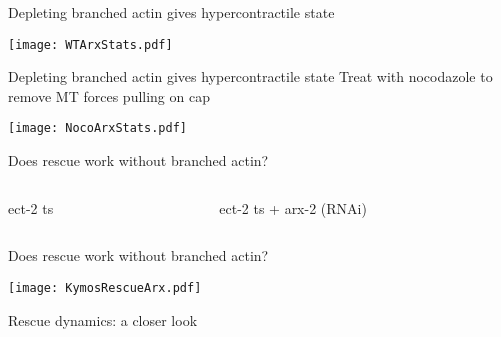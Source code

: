 \documentclass{beamer}
\newcommand{\6}[1]{#1_{\text{6}}}
\newcommand{\3}[1]{#1_{\text{3}}}
\begin{document}
\begin{frame}{Depleting branched actin gives hypercontractile state}

\begin{center}
\texttt{[image: WTArxStats.pdf]}
\end{center}

\end{frame}

\begin{frame}{Depleting branched actin gives hypercontractile state}
Treat with nocodazole to remove MT forces pulling on cap

\begin{center}
\texttt{[image: NocoArxStats.pdf]}
\end{center}

\end{frame}

\begin{frame}{Does rescue work without branched actin?}
\begin{columns}
\begin{column}{0.5\textwidth}
\begin{center}
ect-2 ts
\end{center}
\end{column}
\begin{column}{0.5\textwidth}
\begin{center}
\phantom{123} ect-2 ts + arx-2 (RNAi)
\end{center}
\end{column}
\end{columns}

\end{frame}

\begin{frame}{Does rescue work without branched actin?}
\begin{center}
\texttt{[image: KymosRescueArx.pdf]}
\end{center}

\end{frame}


\begin{frame}{Rescue dynamics: a closer look}

\end{frame}
\end{document}
